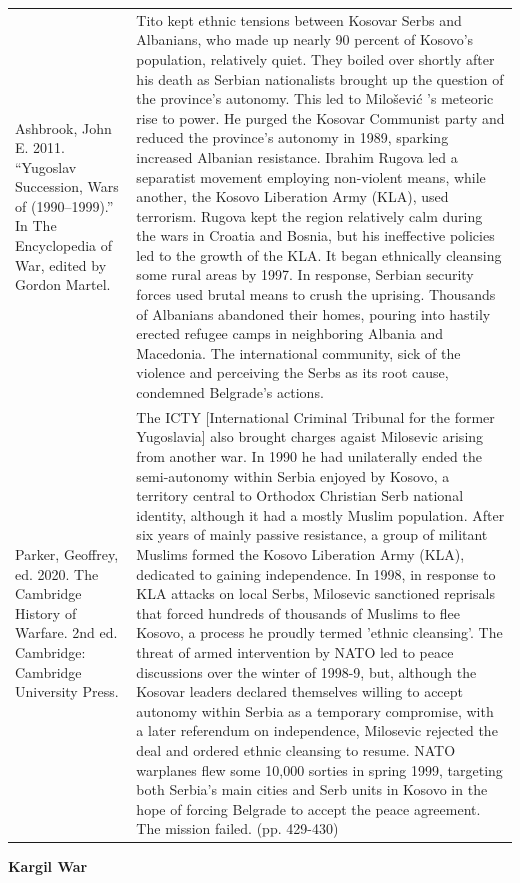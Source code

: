 {\begin{longtable}{p{}p{}}
Ashbrook, John E. 2011. “Yugoslav Succession, Wars of (1990–1999).” In The Encyclopedia of War, edited by Gordon Martel. & Tito kept ethnic tensions between Kosovar Serbs and Albanians, who made up nearly 90 percent of Kosovo's population, relatively quiet. They boiled over shortly after his death as Serbian nationalists brought up the question of the province's autonomy. This led to Milošević 's meteoric rise to power. He purged the Kosovar Communist party and reduced the province's autonomy in 1989, sparking increased Albanian resistance. Ibrahim Rugova led a separatist movement employing non-violent means, while another, the Kosovo Liberation Army (KLA), used terrorism. Rugova kept the region relatively calm during the wars in Croatia and Bosnia, but his ineffective policies led to the growth of the KLA. It began ethnically cleansing some rural areas by 1997. In response, Serbian security forces used brutal means to crush the uprising. Thousands of Albanians abandoned their homes, pouring into hastily erected refugee camps in neighboring Albania and Macedonia. The international community, sick of the violence and perceiving the Serbs as its root cause, condemned Belgrade's actions.
\\
Parker, Geoffrey, ed. 2020. The Cambridge History of Warfare. 2nd ed. Cambridge: Cambridge University Press. & The ICTY [International Criminal Tribunal for the former Yugoslavia] also brought charges agaist Milosevic arising from another war. In 1990 he had unilaterally ended the semi-autonomy within Serbia enjoyed by Kosovo, a territory central to Orthodox Christian Serb national identity, although it had a mostly Muslim population. After six years of mainly passive resistance, a group of militant Muslims formed the Kosovo Liberation Army (KLA), dedicated to gaining independence. In 1998, in response to KLA attacks on local Serbs, Milosevic sanctioned reprisals that forced hundreds of thousands of Muslims to flee Kosovo, a process he proudly termed 'ethnic cleansing'. The threat of armed intervention by NATO led to peace discussions over the winter of 1998-9, but, although the Kosovar leaders declared themselves willing to accept autonomy within Serbia as a temporary compromise, with a later referendum on independence, Milosevic rejected the deal and ordered ethnic cleansing to resume. NATO warplanes flew some 10,000 sorties in spring 1999, targeting both Serbia's main cities and Serb units in Kosovo in the hope of forcing Belgrade to accept the peace agreement. The mission failed. (pp. 429-430)
\\
\end{longtable}}
\clearpage
         \textbf{Kargil War} 

